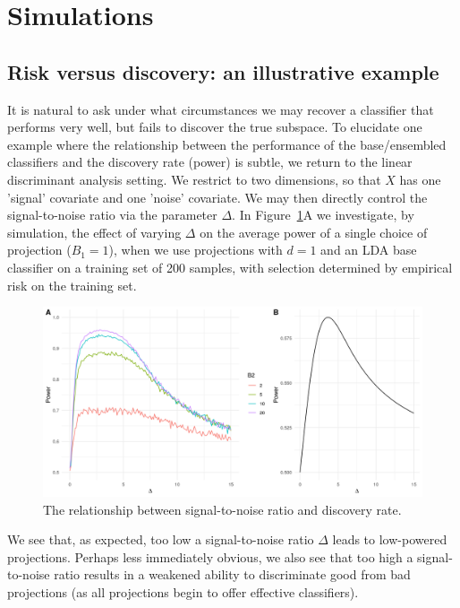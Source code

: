 \documentclass[12pt]{article}
\begin{document}
\section{Simulations}
\subsection{Risk versus discovery: an illustrative example}
It is natural to ask under what circumstances we may recover a classifier that performs very well, but fails to discover the true subspace. To elucidate one example where the relationship between the performance of the base/ensembled classifiers and the discovery rate (power) is subtle, we return to the linear discriminant analysis setting. We restrict to two dimensions, so that $X$ has one 'signal' covariate and one 'noise' covariate. We may then directly control the signal-to-noise ratio via the parameter $\Delta$. In Figure~\ref{fig:ChangingDelta}A we investigate, by simulation, the effect of varying $\Delta$ on the average power of a single choice of projection ($B_1 = 1$), when we use projections with $d=1$ and an LDA base classifier on a training set of 200 samples, with selection determined by empirical risk on the training set. 

\begin{figure}[htbp]
    \centering
    \includegraphics[width=5in]{../results/figures/ChangingDelta.png}
    \caption{The relationship between signal-to-noise ratio and discovery rate.\label{fig:ChangingDelta}}
\end{figure}

We see that, as expected, too low a signal-to-noise ratio $\Delta$ leads to low-powered projections. Perhaps less immediately obvious, we also see that too high a signal-to-noise ratio results in a weakened ability to discriminate good from bad projections (as all projections begin to offer effective classifiers).  
\end{document}
